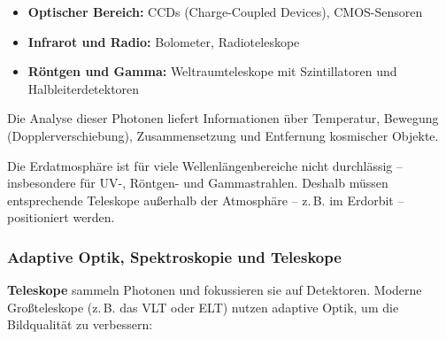 \begin{itemize}
	\item \textbf{Optischer Bereich:} CCDs (Charge-Coupled Devices), CMOS-Sensoren
	\item \textbf{Infrarot und Radio:} Bolometer, Radioteleskope
	\item \textbf{Röntgen und Gamma:} Weltraumteleskope mit Szintillatoren und Halbleiterdetektoren
\end{itemize}

Die Analyse dieser Photonen liefert Informationen über Temperatur, Bewegung (Dopplerverschiebung), Zusammensetzung und Entfernung kosmischer Objekte.

\vspace{1em}
\begin{tcolorbox}[physikbox, title=Warum kommen manche Photonen nicht auf der Erde an?] 
	\label{box:photonen auf erde}
	\small
	Die Erdatmosphäre ist für viele Wellenlängenbereiche nicht durchlässig – insbesondere für UV-, Röntgen- und Gammastrahlen. Deshalb müssen entsprechende Teleskope außerhalb der Atmosphäre – z.\,B. im Erdorbit – positioniert werden.
\end{tcolorbox}

\subsubsection{Adaptive Optik, Spektroskopie und Teleskope}

\textbf{Teleskope} sammeln Photonen und fokussieren sie auf Detektoren. Moderne Großteleskope (z.\,B. das VLT oder ELT) nutzen adaptive Optik, um die Bildqualität zu verbessern:

